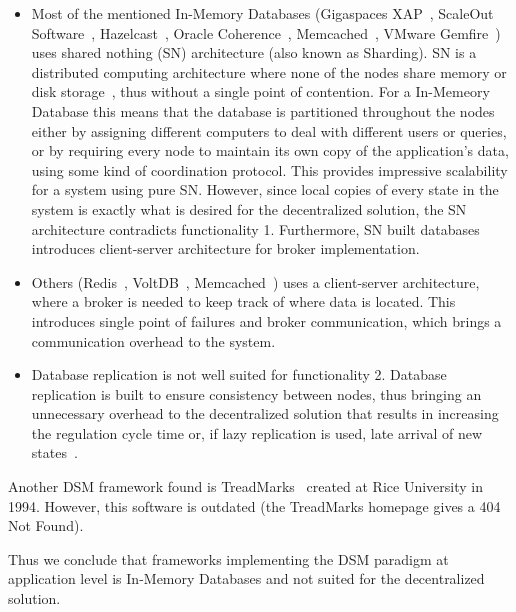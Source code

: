 \begin{itemize}
	\item Most of the mentioned In-Memory Databases (Gigaspaces XAP~\cite{gigaspacesxap}, ScaleOut Software~\cite{scaleout}, Hazelcast~\cite{hazelcast}, Oracle Coherence~\cite{oraclecoherence}, Memcached~\cite{memcached}, VMware Gemfire~\cite{gemfire}) uses shared nothing (SN) architecture (also known as Sharding). SN is a distributed computing architecture where none of the nodes share memory or disk storage~\cite{stonebraker1986case}, thus without a single point of contention. For a In-Memeory Database this means that the database is partitioned throughout the nodes either by assigning different computers to deal with different users or queries, or by requiring every node to maintain its own copy of the application's data, using some kind of coordination protocol. This provides impressive scalability for a system using pure SN. However, since local copies of every state in the system is exactly what is desired for the decentralized solution, the SN architecture contradicts functionality 1. Furthermore, SN built databases introduces client-server architecture for broker implementation.
	\item Others (Redis~\cite{redis}, VoltDB~\cite{voltdb}, Memcached~\cite{memcached}) uses a client-server architecture, where a broker is needed to keep track of where data is located. This introduces single point of failures and broker communication, which brings a communication overhead to the system. 
	\item Database replication is not well suited for functionality 2. Database replication is built to ensure consistency between nodes, thus bringing an unnecessary overhead to the decentralized solution that results in increasing the regulation cycle time or, if lazy replication is used, late arrival of new states~\cite{wiesmann2000database}.
\end{itemize}

Another DSM framework found is TreadMarks~\cite{keleher1994treadmarks} created at Rice University in 1994. However, this software is outdated (the TreadMarks homepage gives a 404 Not Found).

Thus we conclude that frameworks implementing the DSM paradigm at application level is In-Memory Databases and not suited for the decentralized solution.




